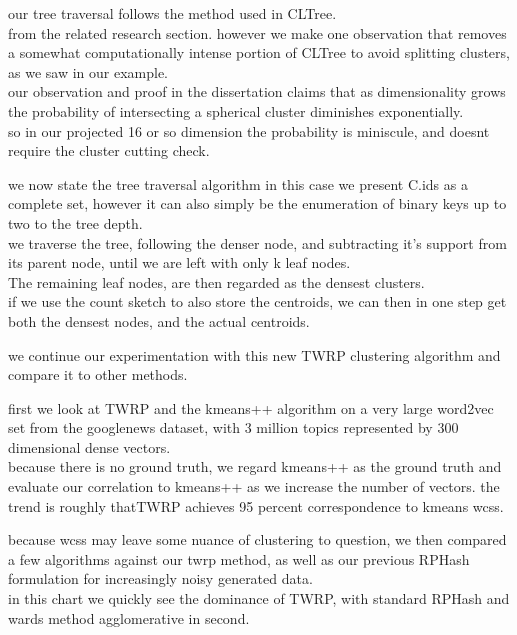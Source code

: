 \documentclass{beamer}
\begin{document}
\begin{frame}[plain]
our tree traversal follows the method used in CLTree. \\
from the related research
section. however we make one observation that removes a somewhat computationally
intense portion of CLTree to avoid splitting clusters, as we saw in our example.\\
our observation and proof in the dissertation claims that as dimensionality grows
the probability of intersecting a spherical cluster diminishes exponentially.\\
so in our projected 16 or so dimension the probability is miniscule, and doesnt
require the cluster cutting check.
\end{frame}

\begin{frame}[plain]
we now state the tree traversal algorithm
in this case we present C.ids as a complete set, however it can also simply be
the enumeration of binary keys up to two to the tree depth. \\
we traverse the tree,
following the denser node, and subtracting it's support from its parent node, until
we are left with only k leaf nodes.\\ 
The remaining leaf nodes, are then regarded as
the densest clusters. \\
if we use the count sketch to also store the centroids, we
can then in one step get both the densest nodes, and the actual centroids.
\end{frame}

\begin{frame}[plain]
we continue our experimentation with this new TWRP clustering algorithm and compare
it to other methods.
\end{frame}

\begin{frame}[plain]
first we look at TWRP and the kmeans++ algorithm on a very large word2vec set from
the googlenews dataset, with 3 million topics represented by 300 dimensional dense
vectors.  \\
because there is no ground truth, we regard kmeans++ as the ground truth
and evaluate our correlation to kmeans++ as we increase the number of vectors. the
trend is roughly thatTWRP achieves 95 percent correspondence to kmeans wcss.
\end{frame}

\begin{frame}[plain]
because wcss may leave some nuance of clustering to question, we then compared
a few algorithms against our twrp method, as well as our previous RPHash formulation
for increasingly noisy generated data. \\
in this chart we quickly see the dominance
of TWRP, with standard RPHash and wards method agglomerative in second.
\end{frame}
\end{document}
